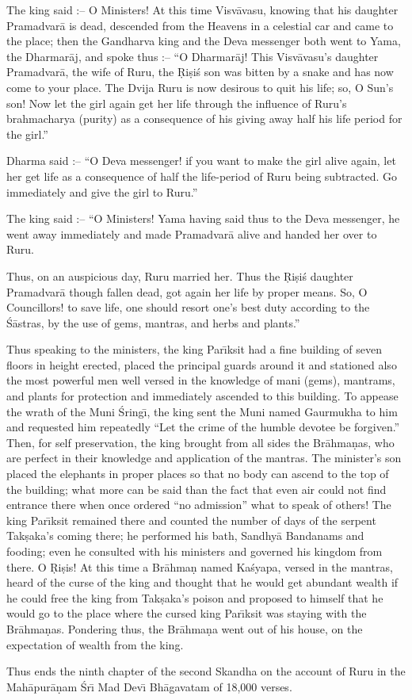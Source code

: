 The king said :-- O Ministers! At this time Visv\=avasu, knowing that his daughter Pramadvar\=a is dead, descended from the Heavens in a celestial car and came to the place; then the Gandharva king and the Deva messenger both went to Yama, the Dharmar\=aj, and spoke thus :-- ``O Dharmar\=aj! This Visv\=avasu's daughter Pramadvar\=a, the wife of Ruru, the \d{R}i\d{s}i\'s son was bitten by a snake and has now come to your place. The Dvija Ruru is now desirous to quit his life; so, O Sun's son! Now let the girl again get her life through the influence of Ruru's brahmacharya (purity) as a consequence of his giving away half his life period for the girl.''

Dharma said :-- ``O Deva messenger! if you want to make the girl alive again, let her get life as a consequence of half the life-period of Ruru being subtracted. Go immediately and give the girl to Ruru.''

The king said :-- ``O Ministers! Yama having said thus to the Deva messenger, he went away immediately and made Pramadvar\=a alive and handed her over to Ruru.

Thus, on an auspicious day, Ruru married her. Thus the \d{R}i\d{s}i\'s daughter Pramadvar\=a though fallen dead, got again her life by proper means. So, O Councillors! to save life, one should resort one's best duty according to the \'S\=astras, by the use of gems, mantras, and herbs and plants.''

Thus speaking to the ministers, the king Par\={\i}ksit had a fine building of seven floors in height erected, placed the principal guards around it and stationed also the most powerful men well versed in the knowledge of mani (gems), mantrams, and plants for protection and immediately ascended to this building. To appease the wrath of the Muni \'Sring\={\i}, the king sent the Muni named Gaurmukha to him and requested him repeatedly ``Let the crime of the humble devotee be forgiven.'' Then, for self preservation, the king brought from all sides the Br\=ahma\d{n}as, who are perfect in their knowledge and application of the mantras. The minister's son placed the elephants in proper places so that no body can ascend to the top of the building; what more can be said than the fact that even air could not find entrance there when once ordered ``no admission'' what to speak of others! The king Par\={\i}ksit remained there and counted the number of days of the serpent Tak\d{s}aka's coming there; he performed his bath, Sandhy\=a Bandanams and fooding; even he consulted with his ministers and governed his kingdom from there. O \d{R}i\d{s}is! At this time a Br\=ahma\d{n} named Ka\'syapa, versed in the mantras, heard of the curse of the king and thought that he would get abundant wealth if he could free the king from Tak\d{s}aka's poison and proposed to himself that he would go to the place where the cursed king Par\={\i}ksit was staying with the Br\=ahma\d{n}as. Pondering thus, the Br\=ahma\d{n}a went out of his house, on the expectation of wealth from the king.

Thus ends the ninth chapter of the second Skandha on the account of Ruru in the Mah\=apur\=a\d{n}am \'Sr\={\i} Mad Dev\={\i} Bh\=agavatam of 18,000 verses.



